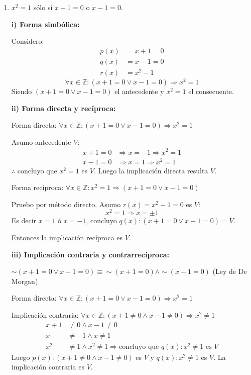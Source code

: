 \documentclass[12pt]{article}
\begin{document}
\begin{enumerate}[label=\alph*.-]
    \textbf{iv)} Dado que $V(p \Rightarrow q) = V$ y $V(q \Rightarrow p) = F$, $p$ es condición \textbf{suficiente pero no necesaria} para $q$.

    \item $x^2 = 1$ sólo si $x + 1 = 0$ o $x - 1 = 0$.

    \textbf{i) Forma simbólica:}

    Considero:
    \begin{align*}
        p(x) &= x + 1 = 0 \\
        q(x) &= x - 1 = 0 \\
        r(x) &= x^2 - 1
    \end{align*}
    \[\forall x \in \mathbb{Z}: (x+1=0 \vee x-1=0) \Rightarrow x^2 = 1\]
    Siendo $(x+1=0 \vee x-1=0)$ el antecedente y $x^2=1$ el consecuente.

    \textbf{ii) Forma directa y recíproca:}

    Forma directa: $\forall x \in \mathbb{Z}: (x+1=0 \vee x-1=0) \Rightarrow x^2=1$

    Asumo antecedente $V$:
    \begin{align*}
        x + 1 = 0 &\Rightarrow x = -1 \Rightarrow x^2 = 1 \\
        x - 1 = 0 &\Rightarrow x = 1 \Rightarrow x^2 = 1
    \end{align*}
    $\therefore$ concluyo que $x^2 = 1$ es $V$. Luego la implicación directa resulta $V$.

    Forma recíproca: $\forall x \in \mathbb{Z}: x^2 = 1 \Rightarrow (x+1=0 \vee x-1=0)$

    Pruebo por método directo. Asumo $r(x) = x^2 - 1 = 0$ es $V$:
    \[x^2 = 1 \Rightarrow x = \pm 1\]
    Es decir $x = 1$ ó $x = -1$, concluyo $q(x): (x+1=0 \vee x-1=0) = V$.

    Entonces la implicación recíproca es $V$.

    \textbf{iii) Implicación contraria y contrarrecíproca:}

    $\sim(x+1=0 \vee x-1=0) \equiv \sim(x+1=0) \wedge \sim(x-1=0)$ \quad (Ley de De Morgan)

    Forma directa: $\forall x \in \mathbb{Z}: (x+1=0 \vee x-1=0) \Rightarrow x^2=1$

    Implicación contraria: $\forall x \in \mathbb{Z}: (x+1\neq 0 \wedge x-1\neq 0) \Rightarrow x^2 \neq 1$
    \begin{align*}
        x + 1 &\neq 0 \wedge x - 1 \neq 0 \\
        x &\neq -1 \wedge x \neq 1 \\
        x^2 &\neq 1 \wedge x^2 \neq 1 \Rightarrow \text{concluyo que } q(x): x^2 \neq 1 \text{ es } V
    \end{align*}
    Luego $p(x): (x+1\neq 0 \wedge x-1\neq 0)$ es $V$ y $q(x): x^2\neq 1$ es $V$. La implicación contraria es $V$.


\end{enumerate}
\end{document}
